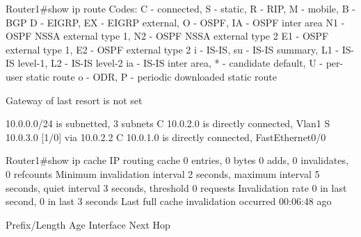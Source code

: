 Router1#show ip route
Codes: C - connected, S - static, R - RIP, M - mobile, B - BGP
       D - EIGRP, EX - EIGRP external, O - OSPF, IA - OSPF inter area 
       N1 - OSPF NSSA external type 1, N2 - OSPF NSSA external type 2
       E1 - OSPF external type 1, E2 - OSPF external type 2
       i - IS-IS, su - IS-IS summary, L1 - IS-IS level-1, L2 - IS-IS level-2
       ia - IS-IS inter area, * - candidate default, U - per-user static route
       o - ODR, P - periodic downloaded static route

Gateway of last resort is not set

     10.0.0.0/24 is subnetted, 3 subnets
C       10.0.2.0 is directly connected, Vlan1
S       10.0.3.0 [1/0] via 10.0.2.2
C       10.0.1.0 is directly connected, FastEthernet0/0

Router1#show ip cache
IP routing cache 0 entries, 0 bytes
   0 adds, 0 invalidates, 0 refcounts
Minimum invalidation interval 2 seconds, maximum interval 5 seconds,
   quiet interval 3 seconds, threshold 0 requests
Invalidation rate 0 in last second, 0 in last 3 seconds
Last full cache invalidation occurred 00:06:48 ago

Prefix/Length           Age       Interface       Next Hop

